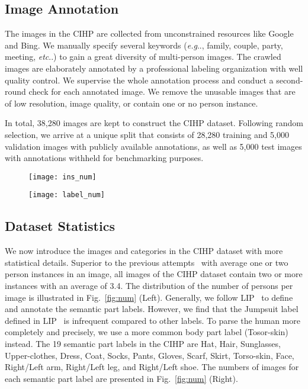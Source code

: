 \documentclass[runningheads]{llncs}
\makeatletter
\DeclareRobustCommand\onedot{\futurelet\@let@token\@onedot}
\def\@onedot{\ifx\@let@token.\else.\null\fi\xspace}
\def\eg{\emph{e.g}\onedot} \def\Eg{\emph{E.g}\onedot}
\def\etc{\emph{etc}\onedot} \def\vs{\emph{vs}\onedot}
\makeatother
\begin{document}
\subsection{Image Annotation}
The images in the CIHP are collected from unconstrained resources like Google and Bing. We manually specify several keywords (\eg, family, couple, party, meeting, \etc) to gain a great diversity of multi-person images. The crawled images are elaborately annotated by a professional labeling organization with well quality control. We supervise the whole annotation process and conduct a second-round check for each annotated image. We remove the unusable images that are of low resolution, image quality, or contain one or no person instance.

In total, 38,280 images are kept to construct the CIHP dataset. Following random selection, we arrive at a unique split that consists of 28,280 training and 5,000 validation images with publicly available annotations, as well as 5,000 test images with annotations withheld for benchmarking purposes.

\begin{figure*}[t]
\begin{subfigure}{0.45\textwidth}
  \texttt{[image: ins\_num]}
\end{subfigure}
\begin{subfigure}{0.7\textwidth}
  \texttt{[image: label\_num]}
\end{subfigure}
\vspace{-2mm}
\caption{Left: Statistics on the number of persons in one image. Right: The data distribution on 19 semantic part labels in the CIHP dataset.}
\vspace{-8mm}
\label{fig:num}
\end{figure*}

\subsection{Dataset Statistics}
We now introduce the images and categories in the CIHP dataset with more statistical details. Superior to the previous attempts~\cite{Gong_2017_CVPR,Co-CNN,chen2014detect} with average one or two person instances in an image, all images of the CIHP dataset contain two or more instances with an average of 3.4. The distribution of the number of persons per image is illustrated in Fig.~\ref{fig:num} (Left). Generally, we follow LIP~\cite{Gong_2017_CVPR} to define and annotate the semantic part labels. However, we find that the Jumpsuit label defined in LIP~\cite{Gong_2017_CVPR} is infrequent compared to other labels. To parse the human more completely and precisely, we use a more common body part label (Tosor-skin) instead. The 19 semantic part labels in the CIHP are Hat, Hair, Sunglasses, Upper-clothes, Dress, Coat, Socks, Pants, Gloves, Scarf, Skirt, Torso-skin, Face, Right/Left arm, Right/Left leg, and Right/Left shoe. The numbers of images for each semantic part label are presented in Fig.~\ref{fig:num} (Right).
\end{document}
